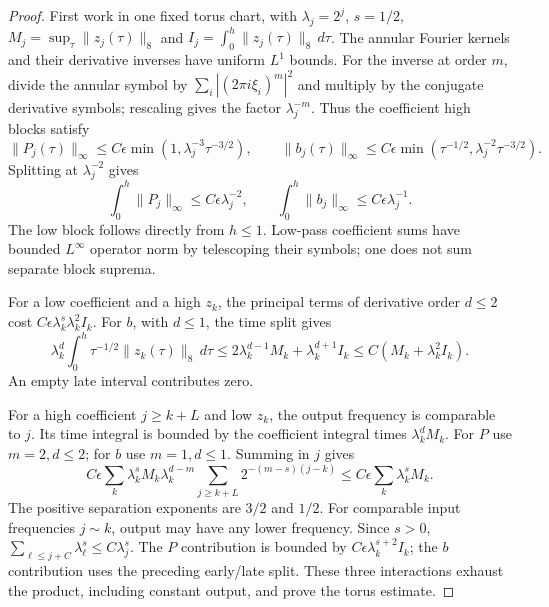 \documentclass[11pt]{article}
\numberwithin{equation}{section}
\theoremstyle{definition}
\theoremstyle{remark}
\begin{document}
\begin{proof}
First work in one fixed torus chart, with
\(\lambda_j=2^j\), \(s=1/2\),
\(M_j=\sup_\tau\|z_j(\tau)\|_8\) and
\(I_j=\int_0^h\|z_j(\tau)\|_8\,d\tau\).
The annular Fourier kernels and their derivative inverses
have uniform \(L^1\) bounds. For the inverse at order \(m\),
divide the annular symbol by
\(\sum_i|(2\pi i\xi_i)^m|^2\) and multiply by the
conjugate derivative symbols; rescaling gives the factor
\(\lambda_j^{-m}\).
Thus the coefficient high blocks satisfy
\[
 \|P_j(\tau)\|_\infty
 \le C\epsilon\min(1,\lambda_j^{-3}\tau^{-3/2}),\qquad
 \|b_j(\tau)\|_\infty
 \le C\epsilon\min(\tau^{-1/2},\lambda_j^{-2}\tau^{-3/2}).
\]
Splitting at \(\lambda_j^{-2}\) gives
\[
 \int_0^h\|P_j\|_\infty\le C\epsilon\lambda_j^{-2},
 \qquad
 \int_0^h\|b_j\|_\infty\le C\epsilon\lambda_j^{-1}.
\]
The low block follows directly from \(h\le1\).
Low-pass coefficient sums have bounded \(L^\infty\)
operator norm by telescoping their symbols; one does
not sum separate block suprema.

For a low coefficient and a high \(z_k\), the principal
terms of derivative order \(d\le2\) cost
\(C\epsilon\lambda_k^s\lambda_k^2I_k\).
For \(b\), with \(d\le1\), the time split gives
\[
 \lambda_k^d\int_0^h\tau^{-1/2}\|z_k(\tau)\|_8\,d\tau
 \le 2\lambda_k^{d-1}M_k+\lambda_k^{d+1}I_k
 \le C(M_k+\lambda_k^2I_k).
\]
An empty late interval contributes zero.

For a high coefficient \(j\ge k+L\) and low \(z_k\),
the output frequency is comparable to \(j\). Its
time integral is bounded by the coefficient integral
times \(\lambda_k^dM_k\). For \(P\) use \(m=2,d\le2\);
for \(b\) use \(m=1,d\le1\). Summing in \(j\) gives
\[
 C\epsilon\sum_k\lambda_k^sM_k\lambda_k^{d-m}
           \sum_{j\ge k+L}2^{-(m-s)(j-k)}
 \le C\epsilon\sum_k\lambda_k^sM_k .
\]
The positive separation exponents are \(3/2\) and \(1/2\).
For comparable input frequencies \(j\sim k\), output
may have any lower frequency. Since \(s>0\),
\(\sum_{\ell\le j+C}\lambda_\ell^s\le C\lambda_j^s\).
The \(P\) contribution is bounded by
\(C\epsilon\lambda_k^{s+2}I_k\); the \(b\)
contribution uses the preceding early/late split.
These three interactions exhaust the product, including
constant output, and prove the torus estimate.


\end{proof}
\end{document}
